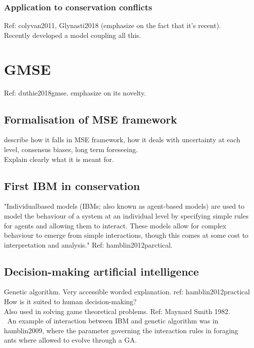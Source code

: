 \documentclass[12pt,a4paper]{article}
\begin{document}
\subsubsection{Application to conservation conflicts}
Ref: colyvan2011, Glynasti2018 (emphasize on the fact that it's recent).\\

Recently developed a model coupling all this.
\section{GMSE} Ref: duthie2018gmse. emphasize on its novelty.

\subsection{Formalisation of MSE framework}

describe how it falls in MSE framework, how it deals with uncertainty at each level, consensus biases, long term foreseeing.\\
Explain clearly what it is meant for.

\subsection{First IBM in conservation}

"Individualbased
models (IBMs; also known as agent-based models) are
used to model the behaviour of a system at an individual level
by specifying simple rules for agents and allowing them to
interact. These models allow for complex behaviour to emerge
from simple interactions, though this comes at some cost to
interpretation and analysis." Ref: hamblin2012parctical.

\subsection{Decision-making artificial intelligence}

Genetic algorithm. Very accessible worded explanation. ref: hamblin2012practical\\
How is it suited to human decision-making?\\
Also used in solving game theoretical problems. Ref: Maynard Smith 1982.\\\
An example of interaction between IBM and genetic algorithm was in hamblin2009, where the parameter governing the interaction rules in foraging ants where allowed to evolve through a GA. 
\end{document}
